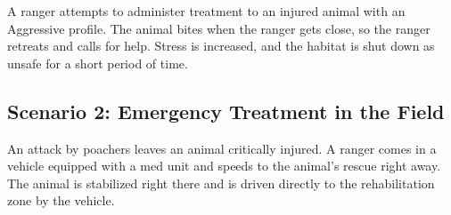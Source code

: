 \documentclass[a4paper,12pt]{article}
\begin{document}
A ranger attempts to administer treatment to an injured animal with an Aggressive profile. The animal bites when the ranger gets close, so the ranger retreats and calls for help. Stress is increased, and the habitat is shut down as unsafe for a short period of time.

\subsection{Scenario 2: Emergency Treatment in the Field}
An attack by poachers leaves an animal critically injured. A ranger comes in a vehicle equipped with a med unit and speeds to the animal’s rescue right away. The animal is stabilized right there and is driven directly to the rehabilitation zone by the vehicle.
\end{document}
